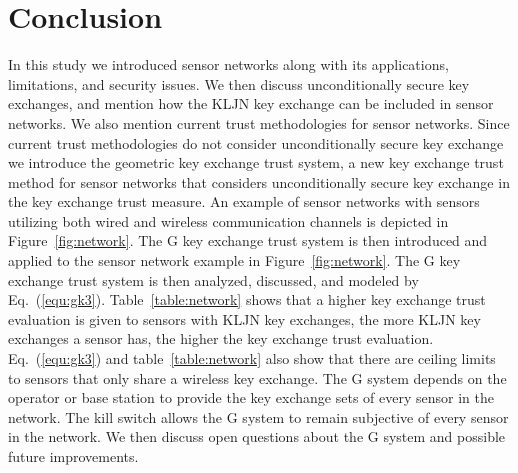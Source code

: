 \documentclass{ws-fnl2}
\begin{document}
\section{Conclusion}

In this study we introduced sensor networks along with its applications, limitations, and security issues. We then discuss unconditionally secure key exchanges, and mention how the KLJN key exchange can be included in sensor networks. We also mention current trust methodologies for sensor networks. Since current trust methodologies do not consider unconditionally secure key exchange we introduce the geometric key exchange trust system, a new key exchange trust method for sensor networks that considers unconditionally secure key exchange in the key exchange trust measure. An example of sensor networks with sensors utilizing both wired and wireless communication channels is depicted in Figure~\ref{fig:network}. The G key exchange trust system is then introduced and applied to the sensor network example in Figure~\ref{fig:network}. The G key exchange trust system is then analyzed, discussed, and modeled by Eq.~(\ref{equ:gk3}). Table~\ref{table:network} shows that a higher key exchange trust evaluation is given to sensors with KLJN key exchanges, the more KLJN key exchanges a sensor has, the higher the key exchange trust evaluation. Eq.~(\ref{equ:gk3}) and table~\ref{table:network} also show that there are ceiling limits to sensors that only share a wireless key exchange. The G system depends on the operator or base station to provide the key exchange sets of every sensor in the network. The kill switch allows the G system to remain subjective of every sensor in the network. We then discuss open questions about the G system and possible future improvements.
\end{document}
